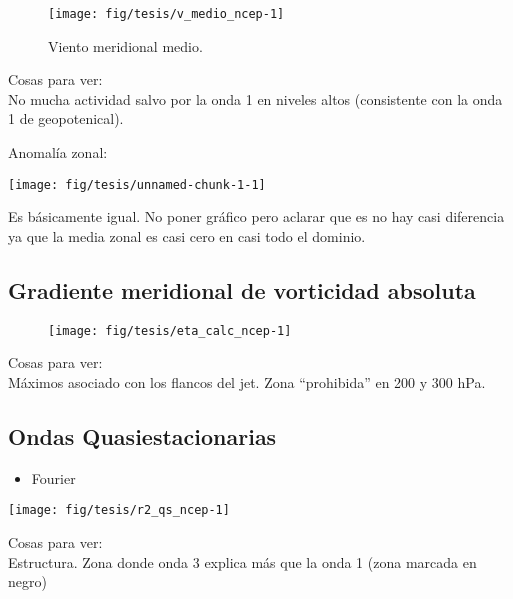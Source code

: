 \documentclass[es-AR,]{tufte-book}
\providecommand{\tightlist}{%
  \setlength{\itemsep}{0pt}\setlength{\parskip}{0pt}}
\begin{document}
\begin{figure*}

{\centering \texttt{[image: fig/tesis/v\_medio\_ncep-1]} 

}

\caption[Viento meridional medio]{Viento meridional medio.}\label{fig:v_medio_ncep}
\end{figure*}

Cosas para ver:\\
No mucha actividad salvo por la onda 1 en niveles altos (consistente con
la onda 1 de geopotenical).

Anomalía zonal:

\texttt{[image: fig/tesis/unnamed-chunk-1-1]}

Es básicamente igual. No poner gráfico pero aclarar que es no hay casi
diferencia ya que la media zonal es casi cero en casi todo el dominio.

\subsection{Gradiente meridional de vorticidad
absoluta}\label{gradiente-meridional-de-vorticidad-absoluta}

\begin{figure*}

{\centering \texttt{[image: fig/tesis/eta\_calc\_ncep-1]} 

}

\end{figure*}

Cosas para ver:\\
Máximos asociado con los flancos del jet. Zona ``prohibida'' en 200 y
300 hPa.

\subsection{Ondas Quasiestacionarias}\label{ondas-quasiestacionarias}

\begin{itemize}
\tightlist
\item
  Fourier
\end{itemize}

\begin{center}\texttt{[image: fig/tesis/r2\_qs\_ncep-1]} \end{center}

Cosas para ver:\\
Estructura. Zona donde onda 3 explica más que la onda 1 (zona marcada en
negro)
\end{document}
